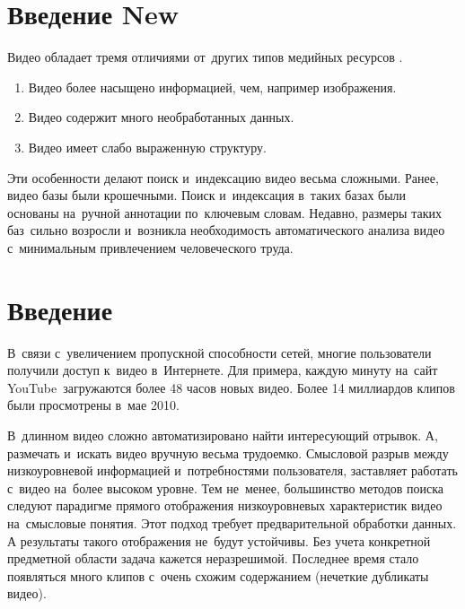 
%
%
%


\section{Введение New}

Видео обладает тремя отличиями от~других типов медийных
ресурсов \cite{Nabeel:2014}.
\begin{enumerate}
    \item Видео более насыщено информацией, чем, например изображения.
    \item Видео содержит много необработанных данных.
    \item Видео имеет слабо выраженную структуру.
\end{enumerate}
Эти особенности делают поиск и~индексацию видео весьма сложными.
Ранее, видео базы были крошечными.
Поиск и~индексация в~таких базах были основаны
на~ручной аннотации по~ключевым словам.
Недавно, размеры таких баз~сильно возросли
и~возникла необходимость автоматического анализа видео
с~минимальным привлечением человеческого труда.



\pagebreak


\section{Введение}

В~связи с~увеличением пропускной способности сетей,
многие пользователи получили доступ к~видео в~Интернете.
Для примера, каждую минуту на~сайт YouTube\  загружаются
более 48 часов новых видео.
Более 14 миллиардов клипов были просмотрены в~мае 2010.

В~длинном видео сложно автоматизировано найти интересующий отрывок.
А, размечать и~искать видео вручную весьма трудоемко.
Смысловой разрыв между низкоуровневой информацией
и~потребностями пользователя, заставляет работать
с~видео на~более высоком уровне.
Тем не~менее, большинство методов поиска следуют парадигме
прямого отображения низкоуровневых характеристик видео
на~смысловые понятия.
Этот подход требует предварительной обработки данных.
А результаты такого отображения не~будут устойчивы.
Без учета конкретной предметной области задача кажется неразрешимой.
Последнее время стало появляться много клипов
с~очень схожим содержанием (нечеткие дубликаты видео).

